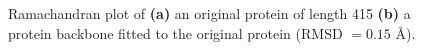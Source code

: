 \begin{figure}
	\centering
	\hspace{1cm}\hspace{0.5cm}
	\caption{Ramachandran plot of \textbf{(a)} an original protein of length 415 \textbf{(b)} a protein backbone fitted to the original protein (RMSD $=0.15$ Å).}
	\label{fig:eval_ramachandran}
\end{figure}


